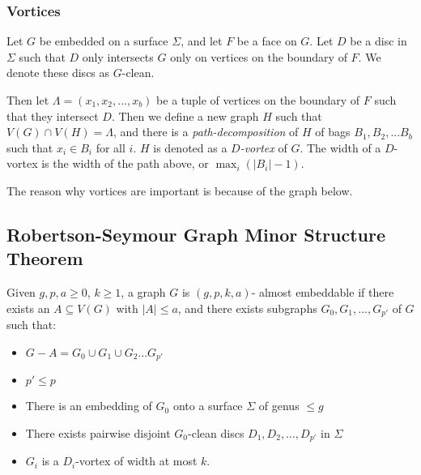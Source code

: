 \documentclass[]{report}
\theoremstyle{definition}
\numberwithin{theorem}{section}
\numberwithin{equation}{section}
\begin{document}
\subsubsection{Vortices}\label{sssec:vortices}
Let $G$ be embedded on a surface $\Sigma$, and let $F$ be a face on $G$. Let $D$ be a disc in $\Sigma$ such that $D$ only intersects $G$ only on vertices on the boundary of $F$. We denote these discs as $G$-clean. 

Then let $\Lambda = (x_1, x_2, ..., x_b)$ be a tuple of vertices on the boundary of $F$ such that they intersect $D$. Then we define a new graph $H$ such that $V(G) \cap V(H) = \Lambda$, and there is a \textit{path-decomposition} of $H$ of bags $B_1, B_2, ... B_b$ such that $x_i \in B_i$ for all $i$. $H$ is denoted as a \textit{$D$-vortex} of $G$. The width of a $D$-vortex is the width of the path above, or $\max_i(|B_i| - 1)$. 

The reason why vortices are important is because of the graph below. 

\subsection{Robertson-Seymour Graph Minor Structure Theorem\cite{robertsonGraphMinorsXVI2003}}\label{ssec:Robertson_Seymour_Graph_Structure}
Given $g, p, a \geq 0$, $k \geq 1$, a graph $G$ is $(g, p, k, a)$- almost embeddable if there exists an $A \subseteq V(G)$ with $|A| \leq a$, and there exists subgraphs $G_0, G_1, ...,  G_{p'}$ of $G$ such that:
\begin{itemize}
	\item $G - A = G_0 \cup G_1 \cup G_2 ... G_{p'}$
	\item $p' \leq p$
	\item There is an embedding of $G_0$ onto a surface $\Sigma$ of genus $\leq g$
	\item There exists pairwise disjoint $G_0$-clean discs $D_1, D_2, ..., D_{p'}$ in $\Sigma$
	\item $G_i$ is a $D_i$-vortex of width at most $k$.
\end{itemize}
\end{document}
